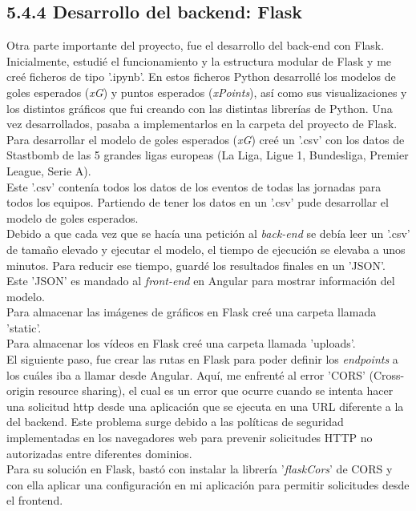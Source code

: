 \subsection{5.4.4 Desarrollo del backend: Flask}
 Otra parte importante del proyecto, fue el desarrollo del back-end con Flask. \\
 Inicialmente, estudié el funcionamiento y la estructura modular de Flask y me creé ficheros de tipo '.ipynb'. En estos ficheros Python desarrollé los modelos de goles esperados (\textit{xG}) y puntos esperados (\textit{xPoints}), así como sus visualizaciones y los distintos gráficos que fui creando con las distintas librerías de Python. Una vez desarrollados, pasaba a implementarlos en la carpeta del proyecto de Flask. \\
 Para desarrollar el modelo de goles esperados (\textit{xG}) creé un '.csv' con los datos de Stastbomb de las 5 grandes ligas europeas (La Liga, Ligue 1, Bundesliga, Premier League, Serie A). \\
 Este '.csv' contenía todos los datos de los eventos de todas las jornadas para todos los equipos. Partiendo de tener los datos en un '.csv' pude desarrollar el modelo de goles esperados. \\
 Debido a que cada vez que se hacía una petición al \textit{back-end} se debía leer un '.csv' de tamaño elevado y ejecutar el modelo, el tiempo de ejecución se elevaba a unos minutos. Para reducir ese tiempo, guardé los resultados finales en un 'JSON'. Este 'JSON' es mandado al \textit{front-end} en Angular para mostrar información del modelo. \\
 Para almacenar las imágenes de gráficos en Flask creé una carpeta llamada 'static'. \\
 Para almacenar los vídeos en Flask creé una carpeta llamada 'uploads'. \\
 El siguiente paso, fue crear las rutas en Flask para poder definir los \textit{endpoints} a los cuáles iba a llamar desde Angular. Aquí, me enfrenté al error 'CORS' (Cross-origin resource sharing), el cual es un error que ocurre cuando se intenta hacer una solicitud http desde una aplicación que se ejecuta en una URL diferente a la del backend. Este problema surge debido a las políticas de seguridad implementadas en los navegadores web para prevenir solicitudes HTTP no autorizadas entre diferentes dominios. \\
 Para su solución en Flask, bastó con instalar la librería '\textit{flaskCors}' de CORS y con ella aplicar una configuración en mi aplicación para permitir solicitudes desde el frontend. \\
 
